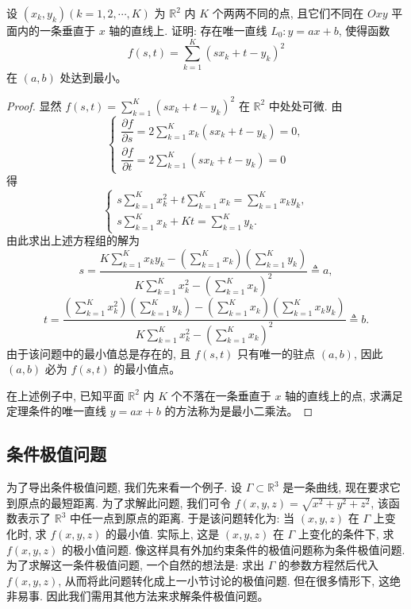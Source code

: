 \documentclass[12pt,fontset=fandol]{ctexart}
\begin{document}
\begin{example}\label{course-example-14-5-3}\quad 设 $(x_k,y_k)(k=1,2,\cdots,K)$ 为 $\mathbb R^2$ 内 $K$ 个两两不同的点, 且它们不同在 $Oxy$ 平面内的一条垂直于 $x$ 轴的直线上. 证明: 存在唯一直线 $L_0:y=ax+b$, 使得函数
\[
  f(s,t)=\sum_{k=1}^K(sx_k+t-y_k)^2
\]
在 $(a,b)$ 处达到最小。

\end{example}
\begin{proof}\quad 显然 $f(s,t)=\sum\limits_{k=1}^K(sx_k+t-y_k)^2$ 在 $\mathbb R^2$ 中处处可微. 由
\[
  \begin{cases}
    \dfrac{\partial f}{\partial s}
    =2\displaystyle\sum_{k=1}^K x_k(sx_k+t-y_k)=0,\\[1.2ex]
    \dfrac{\partial f}{\partial t}
    =2\displaystyle\sum_{k=1}^K (sx_k+t-y_k)=0
  \end{cases}
\]
得
\[
  \begin{cases}
    s\displaystyle\sum_{k=1}^K x_k^2
    +t\displaystyle\sum_{k=1}^K x_k
    =\displaystyle\sum_{k=1}^K x_ky_k,\\[1.2ex]
    s\displaystyle\sum_{k=1}^K x_k
    +Kt
    =\displaystyle\sum_{k=1}^K y_k.
  \end{cases}
\]
由此求出上述方程组的解为
\[
  s=
  \frac{
    K\displaystyle\sum_{k=1}^K x_ky_k
    -\left(\displaystyle\sum_{k=1}^K x_k\right)
     \left(\displaystyle\sum_{k=1}^K y_k\right)}
  {
    K\displaystyle\sum_{k=1}^K x_k^2
    -\left(\displaystyle\sum_{k=1}^K x_k\right)^2}
  \triangleq a,
\]
\[
  t=
  \frac{
    \left(\displaystyle\sum_{k=1}^K x_k^2\right)
    \left(\displaystyle\sum_{k=1}^K y_k\right)
    -\left(\displaystyle\sum_{k=1}^K x_k\right)
     \left(\displaystyle\sum_{k=1}^K x_ky_k\right)}
  {
    K\displaystyle\sum_{k=1}^K x_k^2
    -\left(\displaystyle\sum_{k=1}^K x_k\right)^2}
  \triangleq b.
\]
由于该问题中的最小值总是存在的, 且 $f(s,t)$ 只有唯一的驻点 $(a,b)$, 因此 $(a,b)$ 必为 $f(s,t)$ 的最小值点。

在上述例子中, 已知平面 $\mathbb R^2$ 内 $K$ 个不落在一条垂直于 $x$ 轴的直线上的点, 求满足定理条件的唯一直线 $y=ax+b$ 的方法称为是最小二乘法。

\end{proof}
\subsection{条件极值问题}

为了导出条件极值问题, 我们先来看一个例子. 设 $\Gamma\subset\mathbb R^3$ 是一条曲线, 现在要求它到原点的最短距离. 为了求解此问题, 我们可令 $f(x,y,z)=\sqrt{x^2+y^2+z^2}$, 该函数表示了 $\mathbb R^3$ 中任一点到原点的距离. 于是该问题转化为: 当 $(x,y,z)$ 在 $\Gamma$ 上变化时, 求 $f(x,y,z)$ 的最小值. 实际上, 这是 $(x,y,z)$ 在 $\Gamma$ 上变化的条件下, 求 $f(x,y,z)$ 的极小值问题. 像这样具有外加约束条件的极值问题称为条件极值问题. 为了求解这一条件极值问题, 一个自然的想法是: 求出 $\Gamma$ 的参数方程然后代入 $f(x,y,z)$, 从而将此问题转化成上一小节讨论的极值问题. 但在很多情形下, 这绝非易事. 因此我们需用其他方法来求解条件极值问题。
\end{document}
